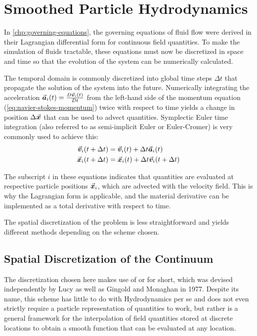 \chapter{Smoothed Particle Hydrodynamics}\label{chp:sph-discretization}


In \autoref{chp:governing-equations}, the governing equations of fluid flow were derived in their Lagrangian differential form for continuous field quantities. To make the simulation of fluids tractable, these equations must now be discretized in space and time so that the evolution of the system can be numerically calculated.

The temporal domain is commonly discretized into global time steps $\Delta t$ that propagate the solution of the system into the future. Numerically integrating the acceleration $\vec{\bm{a}}_i(t)  = \frac{D\vec{\bm{v}}_i(t)}{D t}$ from the left-hand side of the momentum equation (\autoref{eq:navier-stokes-momentum}) twice with respect to time yields a change in position $\Delta\vec{\bm{x}}$ that can be used to advect quantities. Symplectic Euler time integration (also referred to as semi-implicit Euler or Euler-Cromer) is very commonly used to achieve this\autocite*{tutorial}:
\begin{align}\label{eq:symplectic-euler}
  \vec{\bm{v}}_i(t+\Delta t) & = \vec{\bm{v}}_i(t) + \Delta t \vec{\bm{a}}_i(t)          \\
  \vec{\bm{x}}_i(t+\Delta t) & = \vec{\bm{x}}_i(t) + \Delta t \vec{\bm{v}}_i(t+\Delta t)
\end{align}

The subscript $i$ in these equations indicates that quantities are evaluated at respective particle positions $\vec{\bm{x}}_i$, which are advected with the velocity field. This is why the Lagrangian form is applicable, and the material derivative can be implemented as a total derivative with respect to time.

The spatial discretization of the problem is less straightforward and yields different methods depending on the scheme chosen.


\section{Spatial Discretization of the Continuum}
The discretization chosen here makes use of  or  for short, which was devised independently by Lucy\autocite*{sph-lucy-77} as well as Gingold and Monaghan\autocite*{sph-monaghan-gingold-77} in 1977. Despite its name, this scheme has little to do with Hydrodynamics per se and does not even strictly require a particle representation of quantities to work, but rather is a general framework for the interpolation of field quantities stored at discrete locations to obtain a smooth function that can be evaluated at any location.

